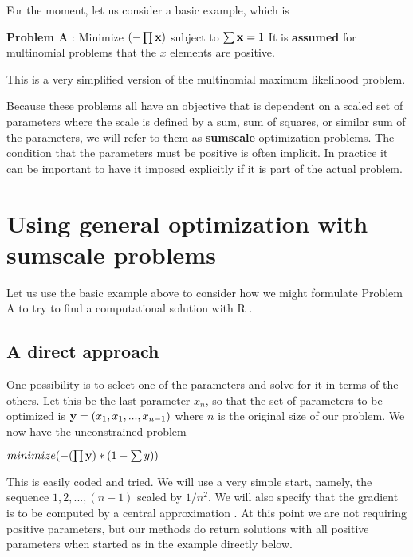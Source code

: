 \documentclass[11pt]{article}\usepackage[]{graphicx}\usepackage[]{color}
\newcommand{\B}[1]{{\bf #1 \rm}}
\newcommand{\R}{{\sf R }}
\begin{document}
For the moment, let us consider a basic example, which is 
\vspace*{10pt}

\B{Problem A}: Minimize  $( - \prod{\B{x}})$ subject to $\sum{\B{x}}=1$
It is \textbf{assumed} for multinomial problems that the $x$ elements are positive.
\vspace*{10pt}

This is a very simplified version of the multinomial maximum likelihood problem. 

Because these problems all have an objective that is dependent on a scaled set of parameters 
where the scale is defined by a sum, sum of squares, or similar sum of the parameters, we will
refer to them as \B{sumscale} optimization problems. The condition that the parameters
must be positive is often implicit. In practice it can be important to have it imposed
explicitly if it is part of the actual problem. 

\section{Using general optimization with sumscale problems}

Let us use the basic example above to consider how we might formulate Problem A to try
to find a computational solution with \R. 

\subsection{A direct approach}

One possibility is to select one of the parameters and solve for it in 
terms of the others. Let this
be the last parameter $x_n$, so that the set of parameters to be 
optimized is $ \B{y} = (x_1, x_1, ..., x_{n-1})$ where 
$n$ is the original size of our problem. We now have the unconstrained problem
\vspace*{10pt}

$ minimize ( - (\prod{\B{y}}) * (1 - \sum{y} ) ) $

\vspace*{10pt}
This is easily coded and tried. We will use a very simple start, namely, the sequence $1,2, ...,
(n-1)$ scaled by $1/n^2$. We will also specify that the gradient is to be computed by a 
central approximation \citep{optextras}. At this point we are not requiring positive
parameters, but our methods do return solutions with all positive parameters when started
as in the example directly below.
\end{document}
